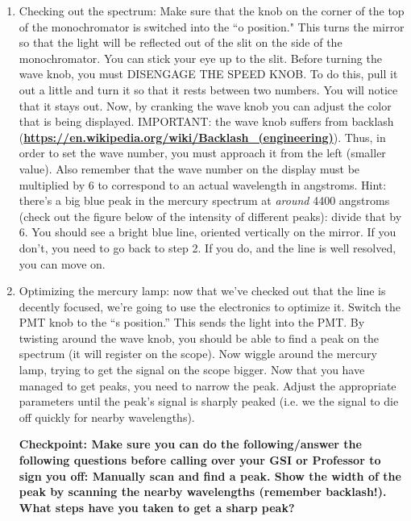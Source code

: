 \documentclass{../lab}
\begin{document}
\begin{enumerate}
    \item Checking out the spectrum:  Make sure that the knob on the corner of the top of the monochromator is switched into the ``o position." This turns the mirror so that the light will be reflected out of the slit on the side of the monochromator. You can stick your eye up to the slit. Before turning the wave knob, you must DISENGAGE THE SPEED KNOB. To do this, pull it out a little and turn it so that it rests between two numbers. You will notice that it stays out. Now, by cranking the wave knob you can adjust the color that is being displayed. IMPORTANT: the wave knob suffers from backlash (\href{https://en.wikipedia.org/wiki/Backlash\_(engineering)}{\textbf{https://en.wikipedia.org/wiki/Backlash\_(engineering)}}). Thus, in order to set the wave number, you must approach it from the left (smaller value). Also remember that the wave number on the display must be multiplied by 6 to correspond to an actual wavelength in angstroms. Hint: there's a big blue peak in the mercury spectrum at \textit{around} 4400 angstroms (check out the figure below of the intensity of different peaks): divide that by 6. You should see a bright blue line, oriented vertically on the mirror. If you don't, you need to go back to step 2. If you do, and the line is well resolved, you can move on.
    
    \item Optimizing the mercury lamp: now that we've checked out that the line is decently focused, we're going to use the electronics to optimize it. Switch the PMT knob to the ``s position.'' This sends the light into the PMT. By twisting around the wave knob, you should be able to find a peak on the spectrum (it will register on the scope). Now wiggle around the mercury lamp, trying to get the signal on the scope bigger. Now that you have managed to get peaks, you need to narrow the peak. Adjust the appropriate parameters until the peak's signal is sharply peaked (i.e. we the signal to die off quickly for nearby wavelengths).
    
    \textbf{Checkpoint: Make sure you can do the following/answer the following questions
    before calling over your GSI or Professor to sign you off: Manually scan and find a peak. Show the width of the peak by scanning the nearby wavelengths (remember backlash!). What steps have you taken to get a sharp peak?}
    

\end{enumerate}
\end{document}
